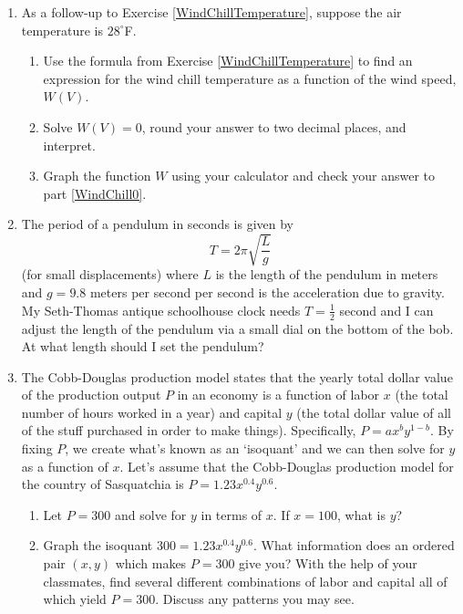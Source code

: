 \begin{enumerate}
\begin{enumerate}
\end{enumerate}

\item  As a follow-up to Exercise \ref{WindChillTemperature}, suppose the air temperature is $28^{\circ}$F.  

\begin{enumerate}

\item Use the formula from Exercise \ref{WindChillTemperature} to find an expression for the wind chill temperature as a function of the wind speed, $W(V)$.  

\item  \label{WindChill0} Solve $W(V) = 0$, round your answer to two decimal places,  and interpret.  

\item  Graph the function $W$ using your calculator and check your answer to part \ref{WindChill0}. 


\end{enumerate}

\item \label{pendulumproblem} The period of a pendulum in seconds is given by \[T = 2\pi \sqrt{\dfrac{L}{g}}\](for small displacements) where $L$ is the length of the pendulum in meters and $g = 9.8$ meters per second per second is the acceleration due to gravity.  My Seth-Thomas antique schoolhouse clock needs $T = \frac{1}{2}$ second and I can adjust the length of the pendulum via a small dial on the bottom of the bob.  At what length should I set the pendulum?


\item The Cobb-Douglas production model states that the yearly total dollar value of the production output $P$ in an economy is a function of labor $x$ (the total number of hours worked in a year) and capital $y$ (the total dollar value of all of the stuff purchased in order to make things).  Specifically, $P = ax^{b}y^{1 - b}$.  By fixing $P$, we create what's known as an `isoquant' and we can then solve for $y$ as a function of $x$.  Let's assume that the Cobb-Douglas production model for the country of Sasquatchia is $P = 1.23x^{0.4}y^{0.6}$.  

\begin{enumerate}

\item Let $P = 300$ and solve for $y$ in terms of $x$.  If $x = 100$, what is $y$?

\item Graph the isoquant $300 = 1.23x^{0.4}y^{0.6}$.  What information does an ordered pair $(x, y)$ which makes $P = 300$ give you?  With the help of your classmates, find several different combinations of labor and capital all of which yield $P = 300$.  Discuss any patterns you may see.


\end{enumerate}
\end{enumerate}
